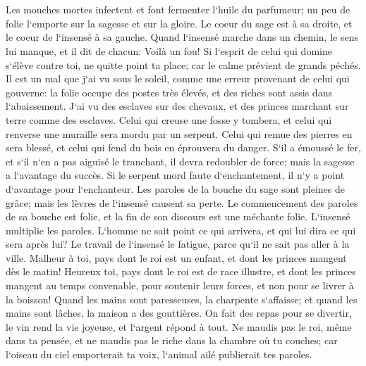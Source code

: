 \chapter{}

\verse Les mouches mortes infectent et font fermenter l`huile du parfumeur; un peu de folie l`emporte sur la sagesse et sur la gloire. 
\verse Le coeur du sage est à sa droite, et le coeur de l`insensé à sa gauche. 
\verse Quand l`insensé marche dans un chemin, le sens lui manque, et il dit de chacun: Voilà un fou! 
\verse Si l`esprit de celui qui domine s`élève contre toi, ne quitte point ta place; car le calme prévient de grands péchés. 
\verse Il est un mal que j`ai vu sous le soleil, comme une erreur provenant de celui qui gouverne: 
\verse la folie occupe des postes très élevés, et des riches sont assis dans l`abaissement. 
\verse J`ai vu des esclaves sur des chevaux, et des princes marchant sur terre comme des esclaves. 
\verse Celui qui creuse une fosse y tombera, et celui qui renverse une muraille sera mordu par un serpent. 
\verse Celui qui remue des pierres en sera blessé, et celui qui fend du bois en éprouvera du danger. 
\verse S`il a émoussé le fer, et s`il n`en a pas aiguisé le tranchant, il devra redoubler de force; mais la sagesse a l`avantage du succès. 
\verse Si le serpent mord faute d`enchantement, il n`y a point d`avantage pour l`enchanteur. 
\verse Les paroles de la bouche du sage sont pleines de grâce; mais les lèvres de l`insensé causent sa perte. 
\verse Le commencement des paroles de sa bouche est folie, et la fin de son discours est une méchante folie. 
\verse L`insensé multiplie les paroles. L`homme ne sait point ce qui arrivera, et qui lui dira ce qui sera après lui? 
\verse Le travail de l`insensé le fatigue, parce qu`il ne sait pas aller à la ville. 
\verse Malheur à toi, pays dont le roi est un enfant, et dont les princes mangent dès le matin! 
\verse Heureux toi, pays dont le roi est de race illustre, et dont les princes mangent au temps convenable, pour soutenir leurs forces, et non pour se livrer à la boisson! 
\verse Quand les mains sont paresseuses, la charpente s`affaisse; et quand les mains sont lâches, la maison a des gouttières. 
\verse On fait des repas pour se divertir, le vin rend la vie joyeuse, et l`argent répond à tout. 
\verse Ne maudis pas le roi, même dans ta pensée, et ne maudis pas le riche dans la chambre où tu couches; car l`oiseau du ciel emporterait ta voix, l`animal ailé publierait tes paroles. 

\chapter{}

